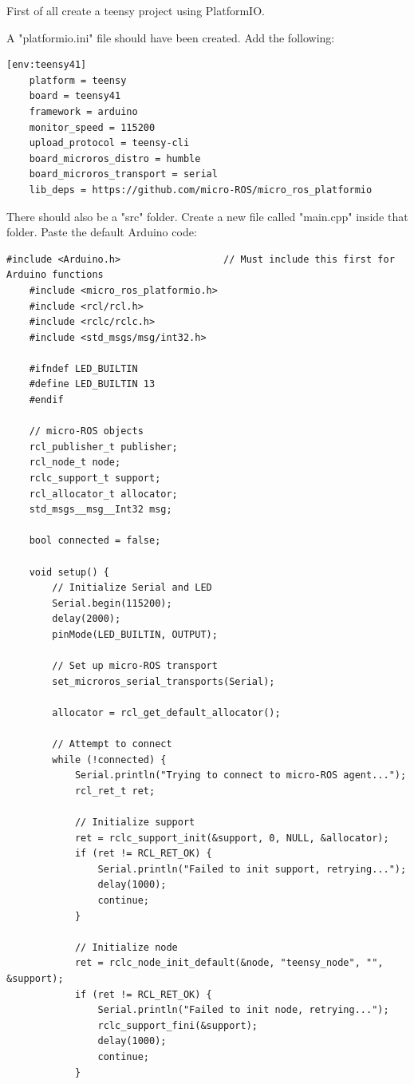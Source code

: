\documentclass[ti,oneside,10pt]{uantwerpenreport}
\begin{document}
First of all create a teensy project using PlatformIO.

A "platformio.ini" file should have been created.
Add the following:
\begin{lstlisting}[style=platformio]
    [env:teensy41]
    platform = teensy
    board = teensy41
    framework = arduino
    monitor_speed = 115200
    upload_protocol = teensy-cli
    board_microros_distro = humble
    board_microros_transport = serial
    lib_deps = https://github.com/micro-ROS/micro_ros_platformio
\end{lstlisting}

There should also be a "src" folder.
Create a new file called "main.cpp" inside that folder.
Paste the default Arduino code:
\begin{lstlisting}[style=platformio]
    #include <Arduino.h>                  // Must include this first for Arduino functions
    #include <micro_ros_platformio.h>
    #include <rcl/rcl.h>
    #include <rclc/rclc.h>
    #include <std_msgs/msg/int32.h>

    #ifndef LED_BUILTIN
    #define LED_BUILTIN 13
    #endif

    // micro-ROS objects
    rcl_publisher_t publisher;
    rcl_node_t node;
    rclc_support_t support;
    rcl_allocator_t allocator;
    std_msgs__msg__Int32 msg;

    bool connected = false;

    void setup() {
        // Initialize Serial and LED
        Serial.begin(115200);
        delay(2000);
        pinMode(LED_BUILTIN, OUTPUT);

        // Set up micro-ROS transport
        set_microros_serial_transports(Serial);

        allocator = rcl_get_default_allocator();

        // Attempt to connect
        while (!connected) {
            Serial.println("Trying to connect to micro-ROS agent...");
            rcl_ret_t ret;

            // Initialize support
            ret = rclc_support_init(&support, 0, NULL, &allocator);
            if (ret != RCL_RET_OK) {
                Serial.println("Failed to init support, retrying...");
                delay(1000);
                continue;
            }

            // Initialize node
            ret = rclc_node_init_default(&node, "teensy_node", "", &support);
            if (ret != RCL_RET_OK) {
                Serial.println("Failed to init node, retrying...");
                rclc_support_fini(&support);
                delay(1000);
                continue;
            }


\end{lstlisting}
\end{document}
